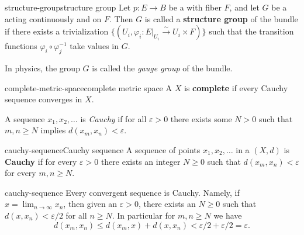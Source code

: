 \begin{topic}{structure-group}{structure group}
    Let $p \colon E \to B$ be a  with fiber $F$, and let $G$ be a  acting continuously and  on $F$. Then $G$ is called a \textbf{structure group} of the bundle if there exists a trivialization $\{ (U_i, \varphi_i \colon E|_{U_i} \xrightarrow{\sim} U_i \times F) \}$ such that the transition functions $\varphi_i \circ \varphi_j^{-1}$ take values in $G$. 
    
    In physics, the group $G$ is called the \textit{gauge group} of the bundle.
\end{topic}


\begin{topic}{complete-metric-space}{complete metric space}
    A  $X$ is \textbf{complete} if every Cauchy sequence converges in $X$.
    
    A sequence $x_1, x_2, \ldots$ is \textit{Cauchy} if for all $\varepsilon > 0$ there exists some $N > 0$ such that $m, n \ge N$ implies $d(x_m, x_n) < \varepsilon$.
\end{topic}

\begin{topic}{cauchy-sequence}{Cauchy sequence}
    A sequence of points $x_1, x_2, \ldots$ in a  $(X, d)$ is \textbf{Cauchy} if for every $\varepsilon > 0$ there exists an integer $N \ge 0$ such that $d(x_m, x_n) < \varepsilon$ for every $m, n \ge N$.
\end{topic}

\begin{example}{cauchy-sequence}
    Every convergent sequence is Cauchy. Namely, if $x = \lim_{n \to \infty} x_n$, then given an $\varepsilon > 0$, there exists an $N \ge 0$ such that $d(x, x_n) < \varepsilon / 2$ for all $n \ge N$. In particular for $m, n \ge N$ we have
    \[ d(x_m, x_n) \le d(x_m, x) + d(x, x_n) < \varepsilon/2 + \varepsilon/2 = \varepsilon . \]
\end{example}


